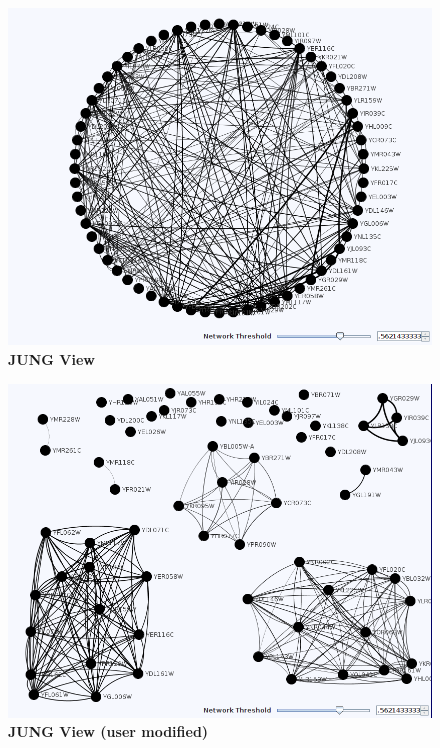 \documentclass{article}
\begin{document}
\begin{figure}
\includegraphics[width=\textwidth]{JUNG.png}
\caption{\textbf{JUNG View}}
\label{JUNG}
\end{figure}

\begin{figure}
\includegraphics[width=\textwidth]{JUNGgrouped.png}
\caption{\textbf{JUNG View (user modified)}}
\label{JUNGgrouped}
\end{figure}
\end{document}
